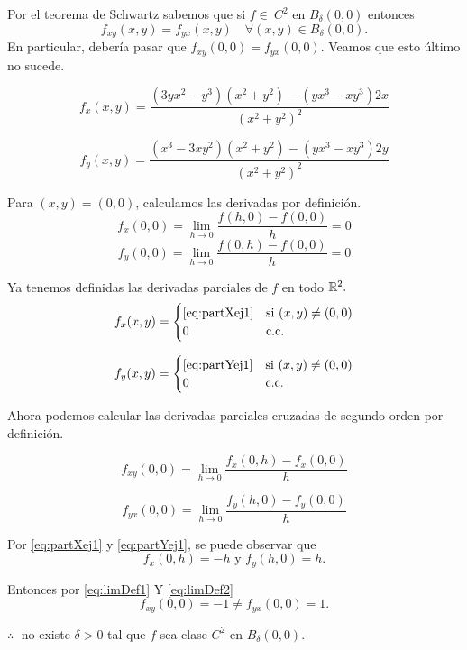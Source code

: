 \begin{solution}
    Por el teorema de Schwartz sabemos que si $f \in\ C^2$ en  $B_{\delta}(0,0)$
    entonces $$  f_{xy} (x,y) = f_{yx} (x,y) \quad \forall (x,y) \in B_{\delta}(0,0).$$ En particular, deber\'ia pasar que $f_{xy} (0,0) = f_{yx}(0,0).$ Veamos que esto \'ultimo no sucede.

    \begin{equation}
        f_x(x,y) = \frac{(3yx^2-y^3)(x^2+y^2) - (yx^3-xy^3)2x}{(x^2+y^2)^2} \label{eq:partXej1}
    \end{equation}

    \begin{equation}
        f_y(x,y) = \frac{(x^3-3xy^2)(x^2+y^2) - (yx^3-xy^3)2y}{(x^2+y^2)^2}  \label{eq:partYej1}
    \end{equation}

    Para $(x,y) = (0,0)$, calculamos las derivadas por definición.
    \[
        f_x(0,0)  = \lim_{h\to0} \frac{f(h,0) - f(0,0)}{h} = 0
    \]
    \[
        f_y(0,0)  =  \lim_{h\to0} \frac{f(0,h) - f(0,0)}{h} = 0
    \]

    Ya tenemos definidas las derivadas parciales de $f$ en todo $\mathbb{R}^2.$
    \[
        f_x(x,y) =
        \begin{cases}
            \eqref{eq:partXej1} & \text{si}\ (x,y) \neq (0,0) \\
            0                   & \text{c.c.}
        \end{cases}
    \]

    \[
        f_y(x,y) =
        \begin{cases}
            \eqref{eq:partYej1} & \text{si}\ (x,y) \neq (0,0) \\
            0                   & \text{c.c.}
        \end{cases}
    \]

    Ahora podemos calcular las derivadas parciales cruzadas de segundo orden por definición.

    \begin{equation}
        f_{xy}(0,0) = \lim_{h\to0} \frac{f_x(0,h) - f_x(0,0)}{h} \label{eq:limDef1}
    \end{equation}

    \begin{equation}
        f_{yx}(0,0) = \lim_{h\to0} \frac{f_y(h,0) - f_y(0,0)}{h}  \label{eq:limDef2}
    \end{equation}

    Por \eqref{eq:partXej1} y \eqref{eq:partYej1}, se puede observar que
    \[
        f_x(0,h) = -h \text{ y } f_y(h,0) = h.
    \]

    Entonces por \eqref{eq:limDef1} Y \eqref{eq:limDef2}
    \[
        f_{xy}(0,0) = -1 \neq f_{yx}(0,0) = 1.
    \]

    $\therefore\;$ no existe $\delta>0$ tal que $f$ sea clase $C^2$ en $B_{\delta}(0,0)$.
\end{solution}

